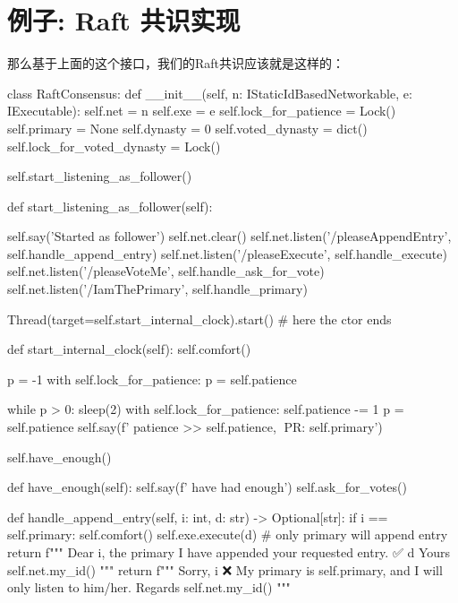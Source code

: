 \documentclass[dvipsnames]{ctexart}
\begin{document}
\section{例子: Raft 共识实现}
那么基于上面的这个接口，我们的Raft共识应该就是这样的：
\begin{simplepy}
class RaftConsensus:
    def __init__(self,
                 n: IStaticIdBasedNetworkable,
                 e: IExecutable):
        self.net = n
        self.exe = e
        self.lock_for_patience = Lock()
        self.primary = None
        self.dynasty = 0
        self.voted_dynasty = dict()
        self.lock_for_voted_dynasty = Lock()

        self.start_listening_as_follower()

    def start_listening_as_follower(self):

        self.say('Started as follower')
        self.net.clear()
        self.net.listen('/pleaseAppendEntry', self.handle_append_entry)
        self.net.listen('/pleaseExecute', self.handle_execute)
        self.net.listen('/pleaseVoteMe', self.handle_ask_for_vote)
        self.net.listen('/IamThePrimary', self.handle_primary)

        Thread(target=self.start_internal_clock).start()  # here the ctor ends

    def start_internal_clock(self):
        self.comfort()

        p = -1
        with self.lock_for_patience:
            p = self.patience

        while p > 0:
            sleep(2)
            with self.lock_for_patience:
                self.patience -= 1
                p = self.patience
            self.say(f' patience >> {self.patience}, 🐢PR: {self.primary}')

        self.have_enough()

    def have_enough(self):
        self.say(f' have had enough')
        self.ask_for_votes()

    def handle_append_entry(self, i: int, d: str) -> Optional[str]:
        if i == self.primary:
            self.comfort()
            self.exe.execute(d)     # only primary will append entry
            return f"""
            Dear {i}, the primary
                 I have appended your requested entry. ✅️ {d}
                        Yours {self.net.my_id()}
            """
        return f"""
        Sorry, {i} ❌️
             My primary is {self.primary}, and I will only listen to him/her.
                Regards {self.net.my_id()}
        """


\end{simplepy}
\end{document}
